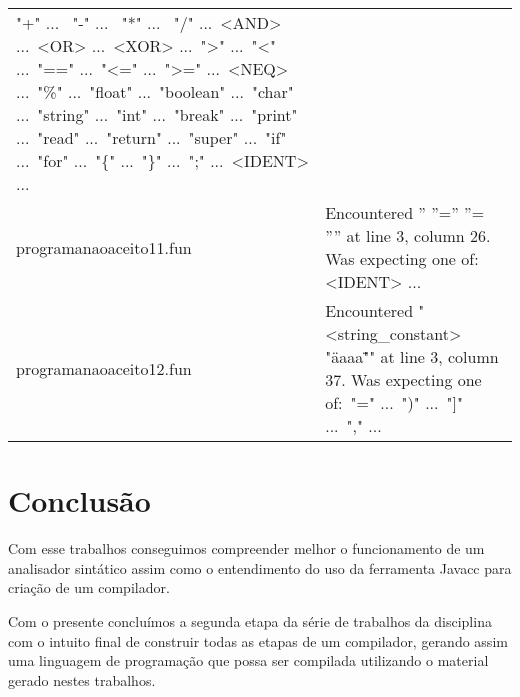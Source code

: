 \documentclass[
	article,			%
	11pt,				%
	oneside,			%
	a4paper,			%
	portuguese,			%
	brazil,				%
	sumario=tradicional
	]{abntex2}
\begin{document}
\begin{center}
\begin{table}[H]
\begin{tabularx}{1\textwidth}{p{5cm}|X}
    "+" ... \
    "-" ... \
    "*" ... \
    "/" ...\
    <AND> ...\
    <OR> ...\
    <XOR> ...\
    ">" ...\
    "<" ...\
    "==" ...\
    "<=" ...\
    ">=" ...\
    <NEQ> ...\
    "\%" ...\
    "float" ...\
    "boolean" ...\
    "char" ...\
    "string" ...\
    "int" ...\
    "break" ...\
    "print" ...\
    "read" ...\
    "return" ...\
    "super" ...\
    "if" ...\
    "for" ...\
    "\{" ...\
    "\}" ...\
    ";" ...\
    <IDENT> ... \\
programanaoaceito11.fun & Encountered '' ''='' ''= '''' at line 3, column 26. Was expecting one of: <IDENT> ...  \\
programanaoaceito12.fun & Encountered " <string\_constant> "\"aaaa\" "" at line 3, column 37. Was expecting one of:\
    "=" ...\
    ")" ...\
    "]" ...\
    "," ...\\ \hline
\end{tabularx}
\end{table}
\end{center}

\newpage
\section{Conclusão}

Com esse trabalhos conseguimos compreender melhor o funcionamento de um analisador sintático assim como o entendimento do uso da ferramenta Javacc para criação de um compilador.

Com o presente concluímos a segunda etapa da série de trabalhos da disciplina com o intuito final de construir todas as etapas de um compilador, gerando assim uma linguagem de programação que possa ser compilada utilizando o material gerado nestes trabalhos.

\end{document}
